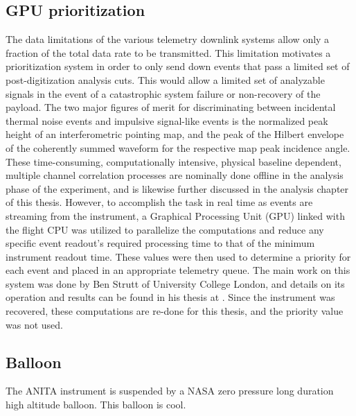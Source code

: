 	\subsection{GPU prioritization}
		The data limitations of the various telemetry downlink systems allow only a fraction of the total data rate to be transmitted.  This limitation motivates a prioritization system in order to only send down events that pass a limited set of post-digitization analysis cuts.  This would allow a limited set of analyzable signals in the event of a catastrophic system failure or non-recovery of the payload.  The two major figures of merit for discriminating between incidental thermal noise events and impulsive signal-like events is the normalized peak height of an interferometric pointing map, and the peak of the Hilbert envelope of the coherently summed waveform for the respective map peak incidence angle.  These time-consuming, computationally intensive, physical baseline dependent, multiple channel correlation processes are nominally done offline in the analysis phase of the experiment, and is likewise further discussed in the analysis chapter of this thesis.  However, to accomplish the task in real time as events are streaming from the instrument, a Graphical Processing Unit (GPU) linked with the flight CPU was utilized to parallelize the computations and reduce any specific event readout's required processing time to that of the minimum instrument readout time.  These values were then used to determine a priority for each event and placed in an appropriate telemetry queue.  The main work on this system was done by Ben Strutt of University College London, and details on its operation and results can be found in his thesis at \cite{BenSThesis}.  Since the instrument was recovered, these computations are re-done for this thesis, and the priority value was not used.
		
	\subsection{Balloon}
		The ANITA instrument is suspended by a NASA zero pressure long duration high altitude balloon.  This balloon is cool.
			
			
